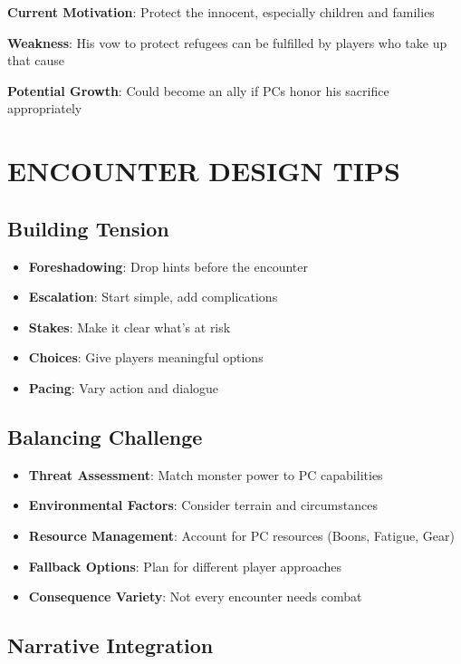 \documentclass[12pt]{article}
\begin{document}
\begin{itemize}
\textbf{Current Motivation}: Protect the innocent, especially children and families

\textbf{Weakness}: His vow to protect refugees can be fulfilled by players who take up that cause

\textbf{Potential Growth}: Could become an ally if PCs honor his sacrifice appropriately

\section{ENCOUNTER DESIGN TIPS}

\subsection*{Building Tension}

\begin{itemize}
\item \textbf{Foreshadowing}: Drop hints before the encounter
\item \textbf{Escalation}: Start simple, add complications
\item \textbf{Stakes}: Make it clear what's at risk
\item \textbf{Choices}: Give players meaningful options
\item \textbf{Pacing}: Vary action and dialogue
\end{itemize}

\subsection*{Balancing Challenge}

\begin{itemize}
\item \textbf{Threat Assessment}: Match monster power to PC capabilities
\item \textbf{Environmental Factors}: Consider terrain and circumstances
\item \textbf{Resource Management}: Account for PC resources (Boons, Fatigue, Gear)
\item \textbf{Fallback Options}: Plan for different player approaches
\item \textbf{Consequence Variety}: Not every encounter needs combat
\end{itemize}

\subsection*{Narrative Integration}


\end{itemize}
\end{document}
